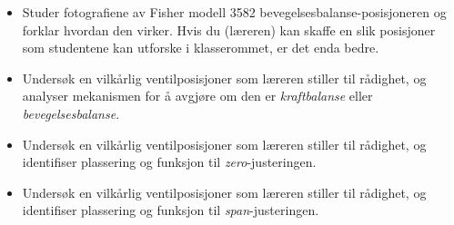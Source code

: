 \begin{itemize}
\item{} Studer fotografiene av Fisher modell 3582 bevegelsesbalanse-posisjoneren og forklar hvordan den virker. Hvis du (læreren) kan skaffe en slik posisjoner som studentene kan utforske i klasserommet, er det enda bedre.
\item{} Undersøk en vilkårlig ventilposisjoner som læreren stiller til rådighet, og analyser mekanismen for å avgjøre om den er {\it kraftbalanse} eller {\it bevegelsesbalanse}.
\item{} Undersøk en vilkårlig ventilposisjoner som læreren stiller til rådighet, og identifiser plassering og funksjon til {\it zero}-justeringen.
\item{} Undersøk en vilkårlig ventilposisjoner som læreren stiller til rådighet, og identifiser plassering og funksjon til {\it span}-justeringen.
\end{itemize}




